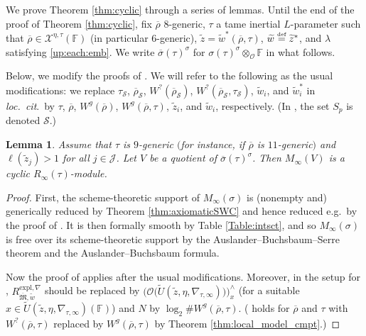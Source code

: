 \documentclass[oneside,a4paper,english, 11pt]{amsart}
\theoremstyle{plain}
\theoremstyle{plain}
\theoremstyle{plain}
\newtheorem{lemma}[thm]{Lemma}
\theoremstyle{plain}
\theoremstyle{plain}
\theoremstyle{plain}
\theoremstyle{definition}
\theoremstyle{definition}
\theoremstyle{definition}
\theoremstyle{remark}
\numberwithin{equation}{section}
\newcommand{\F}{\mathbb{F}}
\newcommand{\fM}{\mathfrak{M}}
\newcommand{\cJ}{\mathcal{J}}
\newcommand{\cO}{\mathcal{O}}
\newcommand{\cS}{\mathcal{S}}
\newcommand{\cX}{\mathcal{X}}
\newcommand{\tld}[1]{\widetilde{#1}}
\newcommand{\rhobar}{\overline{\rho}}
\newcommand{\defeq}{\stackrel{\textrm{\tiny{def}}}{=}}
\newcommand{\ovl}[1]{\overline{#1}}
\begin{document}
We prove Theorem \ref{thm:cyclic} through a series of lemmas. 
Until the end of the proof of Theorem \ref{thm:cyclic}, fix $\rhobar$ $8$-generic, $\tau$ a tame inertial $L$-parameter such that $\rhobar\in \cX^{\eta,\tau}(\F)$ (in particular $6$-generic), $\tld{z} = \tld{w}^*(\rhobar,\tau)$, $\tld{w} \defeq \tld{z}^*$, and $\lambda$ satisfying \eqref{up:each:emb}. 
%
We write $\ovl{\sigma}(\tau)^\sigma$ for $\sigma(\tau)^\sigma\otimes_{\cO}\F$ in what follows.

Below, we modify the proofs of \cite[\S 5.1]{LLLM2}. 
We will refer to the following as the usual modifications: we replace $\tau_{\cS}$, $\rhobar_{\cS}$, $W^?(\rhobar_\cS)$, $W^{?}(\rhobar_{\cS},\tau_{\cS})$, $\tld{w}_i$, and $\tld{w}_i^*$ in \emph{loc.~cit}.~by $\tau$, $\rhobar$, $W^g(\rhobar)$, $W^{g}(\rhobar,\tau)$, $\tld{z}_i$, and $\tld{w}_i$, respectively.
(In \cite[\S 5.1]{LLLM2}, the set $S_p$ is denoted $\cS$.)



\begin{lemma} 
\label{lem:4:wgt}
Assume that $\tau$ is $9$-generic $($for instance, if $\rhobar$ is $11$-generic$)$ and $\ell(\widetilde{z}_j) > 1$ for all $j\in\cJ$. 
Let $V$ be a quotient of $\ovl{\sigma}(\tau)^\sigma$.
Then $M_\infty(V)$ is a cyclic $R_\infty(\tau)$-module.
\end{lemma}
\begin{proof}
First, the scheme-theoretic support of $M_\infty(\sigma)$ is (nonempty and) generically reduced by Theorem \ref{thm:axiomaticSWC} and hence reduced e.g.~by the proof of \cite[Lemma 3.6.2]{LLLM2}. 
It is then formally smooth by Table \ref{Table:intsct}, and so $M_\infty(\sigma)$ is free over its scheme-theoretic support by the Auslander--Buchsbaum--Serre theorem and the Auslander--Buchsbaum formula. 

Now the proof of \cite[Lemma 5.1.3]{LLLM2} applies after the usual modifications. 
Moreover, in the setup for \cite[Proposition 4.3.7, Lemma 3.6.10]{LLLM2}, $R^{\mathrm{expl},\nabla}_{\ovl{\fM},\tld{w}}$ should be replaced by $\Big(\cO\big(\tld{U}(\tld{z},\eta,\nabla_{\tau,\infty})\big)\Big)^\wedge_{x}$ (for a suitable $x\in \tld{U}(\tld{z},\eta,\nabla_{\tau,\infty})(\F)$) and $N$ by $\log_2 \# W^g(\rhobar,\tau)$. 
(\cite[Lemma 3.6.10]{LLLM2} holds for $\rhobar$ and $\tau$ with $W^?(\rhobar,\tau)$ replaced by $W^g(\rhobar,\tau)$ by Theorem \ref{thm:local_model_cmpt}.) 
\end{proof}
\end{document}
